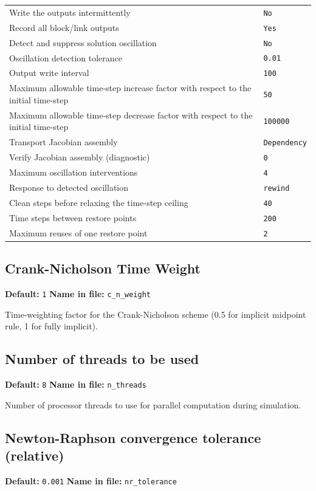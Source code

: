 \documentclass[11pt]{article}
\begin{document}
\begin{longtable}{@{}p{}p{}@{}}
Write the outputs intermittently & \texttt{\small No} \\
Record all block/link outputs & \texttt{\small Yes} \\
Detect and suppress solution oscillation & \texttt{\small No} \\
Oscillation detection tolerance & \texttt{\small 0.\allowbreak{}01} \\
Output write interval & \texttt{\small 100} \\
Maximum allowable time-step increase factor with respect to the initial time-step & \texttt{\small 50} \\
Maximum allowable time-step decrease factor with respect to the initial time-step & \texttt{\small 100000} \\
Transport Jacobian assembly & \texttt{\small Dependency} \\
Verify Jacobian assembly (diagnostic) & \texttt{\small 0} \\
Maximum oscillation interventions & \texttt{\small 4} \\
Response to detected oscillation & \texttt{\small rewind} \\
Clean steps before relaxing the time-step ceiling & \texttt{\small 40} \\
Time steps between restore points & \texttt{\small 200} \\
Maximum reuses of one restore point & \texttt{\small 2} \\
\bottomrule\end{longtable}
\subsection{Crank-Nicholson Time Weight}
{\small \textbf{Default:} \texttt{1} \quad\textbullet\quad \textbf{Name in file:} \texttt{c\_\allowbreak{}n\_\allowbreak{}weight}}

Time-weighting factor for the Crank-Nicholson scheme (0.5 for implicit midpoint rule, 1 for fully implicit).
\subsection{Number of threads to be used}
{\small \textbf{Default:} \texttt{8} \quad\textbullet\quad \textbf{Name in file:} \texttt{n\_\allowbreak{}threads}}

Number of processor threads to use for parallel computation during simulation.
\subsection{Newton-Raphson convergence tolerance (relative)}
{\small \textbf{Default:} \texttt{0.\allowbreak{}001} \quad\textbullet\quad \textbf{Name in file:} \texttt{nr\_\allowbreak{}tolerance}}
\end{document}
